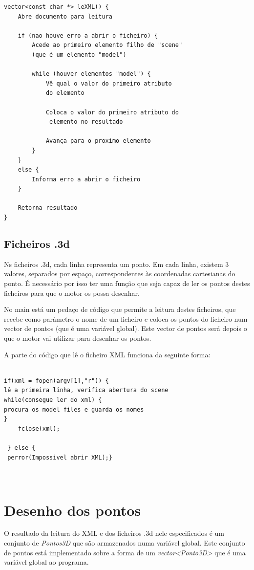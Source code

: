 \begin{Verbatim}
vector<const char *> leXML() {
	Abre documento para leitura
	
	if (nao houve erro a abrir o ficheiro) {
		Acede ao primeiro elemento filho de "scene" 
		(que é um elemento "model")
		
		while (houver elementos "model") {
			Vê qual o valor do primeiro atributo 
			do elemento
			
			Coloca o valor do primeiro atributo do
			 elemento no resultado
			 
			Avança para o proximo elemento
		}
	}
	else {
		Informa erro a abrir o ficheiro
	}
	
	Retorna resultado
}
\end{Verbatim}

\subsection{Ficheiros .3d}


Ns ficheiros .3d, cada linha representa um ponto. Em cada linha, existem 3 valores, separados por espaço, correspondentes às coordenadas cartesianas do ponto. É necessário por isso ter uma função que seja capaz de ler os pontos destes ficheiros para que o motor os possa desenhar.

No main está um pedaço de código que permite a leitura destes ficheiros, que recebe como parâmetro o nome de um ficheiro e coloca os pontos do ficheiro num vector de pontos (que é uma variável global). Este vector de pontos será depois o que o motor vai utilizar para desenhar os pontos.

A parte do código que lê o ficheiro XML funciona da seguinte forma:

\begin{Verbatim}

if(xml = fopen(argv[1],"r")) {
lê a primeira linha, verifica abertura do scene
while(consegue ler do xml) {
procura os model files e guarda os nomes 
}
	fclose(xml);

 } else {
 perror(Impossivel abrir XML);}
 
 
\end{Verbatim}

\section{Desenho dos pontos}

O resultado da leitura do XML e dos ficheiros .3d nele especificados é um conjunto de \textit{Pontos3D} que são armazenados numa variável global. Este conjunto de pontos está implementado sobre a forma de um \textit{vector<Ponto3D>} que é uma variável global ao programa.

